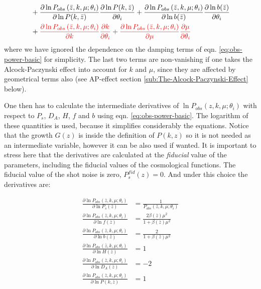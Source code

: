 \begin{itemize}
\begin{align}
 & +\frac{\partial\ln P_{obs}\left(\bar{z},k,\mu;\theta_{i}\right)}{\partial\ln P(k,\bar{z})}\frac{\partial\ln P(k,\bar{z})}{\partial\theta_{i}}+\frac{\partial\ln P_{obs}\left(\bar{z},k,\mu;\theta_{i}\right)}{\partial\ln b(\bar{z})}\frac{\partial\ln b(\bar{z})}{\partial\theta_{i}}\label{eq:derivatives-of-lnPobs}\\
 & +{\color{red}\frac{\partial\ln P_{obs}\left(\bar{z},k,\mu;\theta_{i}\right)}{\partial k}\frac{\partial k}{\partial\theta_{i}}+\frac{\partial\ln P_{obs}\left(\bar{z},k,\mu;\theta_{i}\right)}{\partial\mu}\frac{\partial\mu}{\partial\theta_{i}}}\nonumber 
\end{align}
where we have ignored the dependence on the damping terms of eqn.
\ref{eq:obs-power-basic} for simplicity. The last two terms are non-vanishing
if one takes the Alcock-Paczynski effect into account for $k$ and
$\mu$, since they are affected by geometrical terms also (see AP-effect
section \ref{sub:The-Alcock-Paczynski-Effect} below).
\end{itemize}
One then has to calculate the intermediate derivatives of $\ln P_{obs}(z,k,\mu;\theta_{i})$
with respect to $P_{s}$, $D_{A}$, $H$, $f$ and $b$ using eqn.
\ref{eq:obs-power-basic}. The logarithm of these quantities is used,
because it simplifies considerably the equations. Notice that the
growth $G(z)$ is inside the definition of $P(k,z)$ so it is not
needed as an intermediate variable, however it can be also used if
wanted. It is important to stress here that the derivatives are calculated
at the \emph{fiducial} value of the parameters, including the fiducial
values of the cosmological functions. The fiducial value of the shot
noise is zero, $P_{s}^{fid}(z)=0$. And under this choice the derivatives
are:

\begin{subequations}

\begin{align}
\frac{\partial\ln P_{obs}\left(\bar{z},k,\mu;\theta_{i}\right)}{\partial\ln P_{s}(\bar{z})} & =\frac{1}{P_{obs}\left(\bar{z},k,\mu;\theta_{i}\right)}\\
\frac{\partial\ln P_{obs}\left(\bar{z},k,\mu;\theta_{i}\right)}{\partial\ln f(\bar{z})} & =\frac{2\beta(\bar{z})\mu^{2}}{1+\beta(\bar{z})\mu^{2}}\\
\frac{\partial\ln P_{obs}\left(\bar{z},k,\mu;\theta_{i}\right)}{\partial\ln b(\bar{z})} & =\frac{2}{1+\beta(\bar{z})\mu^{2}}\\
\frac{\partial\ln P_{obs}\left(\bar{z},k,\mu;\theta_{i}\right)}{\partial\ln H(\bar{z})} & =1\\
\frac{\partial\ln P_{obs}\left(\bar{z},k,\mu;\theta_{i}\right)}{\partial\ln D_{A}(\bar{z})} & =-2\\
\frac{\partial\ln P_{obs}\left(\bar{z},k,\mu;\theta_{i}\right)}{\partial\ln P(k,\bar{z})} & =1
\end{align}
\label{eq: partial-derivs-subeqns}

\end{subequations}

